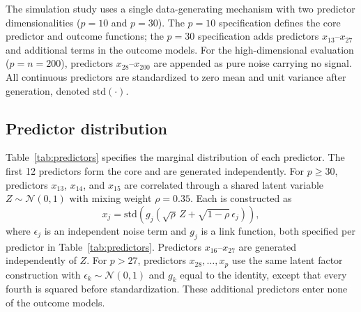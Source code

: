 \documentclass[11pt]{article}
\theoremstyle{plain}
\theoremstyle{definition}
\theoremstyle{remark}
\begin{document}
The simulation study uses a single data-generating mechanism with two predictor dimensionalities ($p = 10$ and $p = 30$). The $p = 10$ specification defines the core predictor and outcome functions; the $p = 30$ specification adds predictors $x_{13}$--$x_{27}$ and additional terms in the outcome models. For the high-dimensional evaluation ($p = n  = 200$), predictors $x_{28}$--$x_{200}$ are appended as pure noise carrying no signal. All continuous predictors are standardized to zero mean and unit variance after generation, denoted $\mathrm{std}(\cdot)$.

\subsection*{Predictor distribution}

Table~\ref{tab:predictors} specifies the marginal distribution of each predictor. The first 12 predictors form the core and are generated independently. For $p \geq 30$, predictors $x_{13}$, $x_{14}$, and $x_{15}$ are correlated through a shared latent variable $Z \sim \mathcal{N}(0,1)$ with mixing weight $\rho = 0.35$. Each is constructed as
\[
x_j = \mathrm{std}\!\left(g_j\!\left(\sqrt{\rho}\, Z + \sqrt{1 - \rho}\, \epsilon_j\right)\right),
\]
where $\epsilon_j$ is an independent noise term and $g_j$ is a link function, both specified per predictor in Table~\ref{tab:predictors}. Predictors $x_{16}$--$x_{27}$ are generated independently of $Z$. For $p > 27$, predictors $x_{28}, \ldots, x_p$ use the same latent factor construction with $\epsilon_k \sim \mathcal{N}(0,1)$ and $g_k$ equal to the identity, except that every fourth is squared before standardization. These additional predictors enter none of the outcome models.
\end{document}
